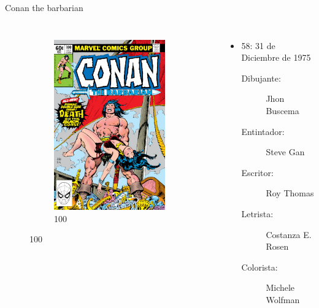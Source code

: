 \begin{frame}{Conan the barbarian}
\begin{columns}
\begin{figure}[htb]
\begin{subfigure}[b]{0.4\textwidth}
				\includegraphics[width=\textwidth]{img/CTB100}
				\caption{100}
			\end{subfigure}
		\end{figure}
		\begin{itemize}
			\item 58: 31 de Diciembre de 1975
			\begin{description}
				\item[Dibujante:] Jhon Buscema
				\item[Entintador:] Steve Gan
				\item[Escritor:] Roy Thomas
				\item[Letrista:] Costanza E. Rosen
				\item[Colorista:] Michele Wolfman

\end{description}
\end{itemize}
\end{columns}
\end{frame}
